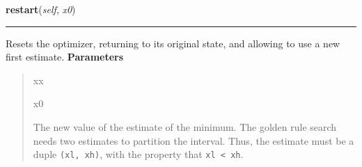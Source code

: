     \label{peach:optm:linear:GoldenRule:restart}

    \vspace{0.5ex}

\hspace{.8\funcindent}\begin{boxedminipage}{\funcwidth}

    \raggedright \textbf{restart}(\textit{self}, \textit{x0})

    \vspace{-1.5ex}

    \rule{\textwidth}{0.5\fboxrule}
\setlength{\parskip}{2ex}

Resets the optimizer, returning to its original state, and allowing to
use a new first estimate.
\setlength{\parskip}{1ex}
      \textbf{Parameters}
      \vspace{-1ex}

      \begin{quote}
        \begin{Ventry}{xx}

          \item[x0]


The new value of the estimate of the minimum. The golden rule search
needs two estimates to partition the interval. Thus, the estimate
must be a duple \texttt{(xl, xh)}, with the property that \texttt{xl < xh}.
        \end{Ventry}

      \end{quote}

    \end{boxedminipage}

    \vspace{0.5ex}

